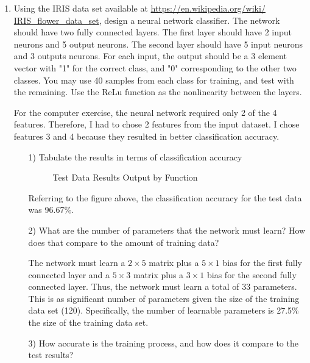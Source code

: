 \documentclass[fleqn]{article}
\begin{document}
\begin{enumerate}
		\item Using the IRIS data set available at \href{https://en.wikipedia.org/wiki/IRIS_flower_data_set}{https://en.wikipedia.org/wiki/\\IRIS\_flower\_data\_set}, design a neural network classifier. The network should have two fully connected layers. The first layer should have 2 input neurons and 5 output neurons. The second layer should have 5 input neurons and 3 outputs neurons. For each input, the output should be a 3 element vector with "1" for the correct class, and "0" corresponding to the other two classes. You may use 40 samples from each class for training, and test with the remaining. Use the ReLu function as the nonlinearity between the layers.
		
		For the computer exercise, the neural network required only 2 of the 4 features. Therefore, I had to chose 2 features from the input dataset. I chose features 3 and 4 because they resulted in better classification accuracy.
		
		\pagebreak
		\begin{enumerate}
			\item[1)] Tabulate the results in terms of classification accuracy
			
			\begin{figure}[H]
				\centerline{}
				\caption{Test Data Results Output by Function}
				\label{test_data_results}
			\end{figure}
		
			Referring to the figure above, the classification accuracy for the test data was 96.67\%.
			
			\item[2)] What are the number of parameters that the network must learn? How does that compare to the amount of training data?
			
			The network must learn a $2 \times 5$ matrix plus a $5 \times 1$ bias for the first fully connected layer and a $5 \times 3$ matrix plus a $3 \times 1$ bias for the second fully connected layer. Thus, the network must learn a total of 33 parameters. This is as significant number of parameters given the size of the training data set (120). Specifically, the number of learnable parameters is 27.5\% the size of the training data set. 
			
			\item[3)] How accurate is the training process, and how does it compare to the test results?
			

\end{enumerate}
\end{enumerate}
\end{document}
